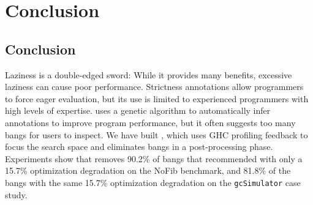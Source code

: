 \chapter{Conclusion} 

\label{Chapter7} %


\section{Conclusion}

Laziness is a double-edged sword: While it provides many benefits,
excessive laziness can cause poor performance. Strictness annotations
allow programmers to force eager evaluation, but its use is limited to
experienced programmers with high levels of expertise. \Ao{} uses a
genetic algorithm to automatically infer annotations to improve
program performance, but it often suggests too many bangs for users to
inspect. We have built \At{}, which uses GHC profiling feedback to
focus the search space and eliminates \useless{} bangs in a
post-processing phase.  Experiments show
that \At{} removes 90.2\% of bangs that \Ao{} recommended with only a
15.7\% optimization degradation on the NoFib benchmark,
and 81.8\% of the bangs with the same 15.7\% optimization degradation
on the \texttt{gcSimulator} case study.

